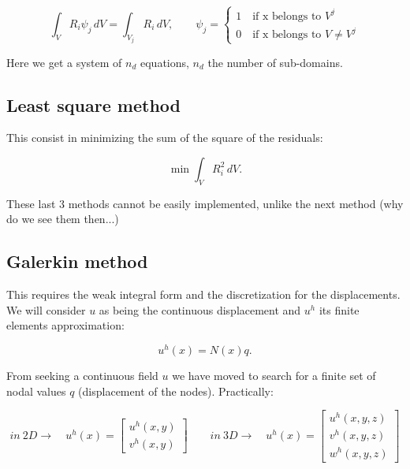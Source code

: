 	\begin{equation}
	\int _V R_i \psi _j\, dV = \int _{V_j} R_i\, dV, \qquad \psi _j = \left\{
	\begin{array}{c}
	1 \quad \mbox{if x belongs to } V^j\\
	0 \quad \mbox{if x belongs to } V\neq V^j	
	\end{array}
	\right.
	\end{equation}
	
	Here we get a system of $n_d$ equations, $n_d$ the number of sub-domains.
	
\subsection{Least square method}
	This consist in minimizing the sum of the square of the residuals:
	
	\begin{equation}
	\min \int _V R_i^2 \, dV.
	\end{equation}
	
	These last 3 methods cannot be easily implemented, unlike the next method (why do we see them then...)
	
\subsection{Galerkin method}
	This requires the weak integral form and the discretization for the displacements. We will consider $u$ as being the continuous displacement and $u^h$ its finite elements approximation:
	
	\begin{equation}
	u^h (x)= N(x) q. 
	\end{equation}
	
	From seeking a continuous field $u$ we have moved to search for a finite set of nodal values $q$ (displacement of the nodes). Practically:
	
	\begin{equation}
	in\ 2D \rightarrow \quad u^h (x) = \left[
	\begin{array}{c}
	u^h(x,y)\\
	v^h(x,y)
	\end{array}
	\right]
	\qquad 
	in\ 3D \rightarrow \quad u^h (x) = \left[
	\begin{array}{c}
	u^h(x,y,z)\\
	v^h(x,y,z)\\
	w^h(x,y,z)
	\end{array}
	\right]
	\end{equation}
	
